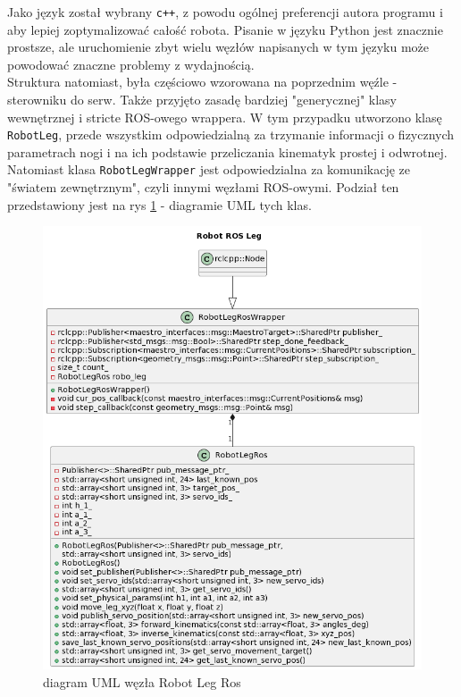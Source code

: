 Jako język został wybrany \texttt{c++}, z powodu ogólnej preferencji autora programu i aby lepiej zoptymalizować całość robota. Pisanie w języku Python jest znacznie prostsze, ale uruchomienie zbyt wielu węzłów napisanych w tym języku może powodować znaczne problemy z wydajnością.\\

Struktura natomiast, była częściowo wzorowana na poprzednim węźle - sterowniku do serw. Także przyjęto zasadę bardziej "generycznej" klasy wewnętrznej i stricte ROS-owego wrappera. W tym przypadku utworzono klasę \texttt{RobotLeg}, przede wszystkim odpowiedzialną za trzymanie informacji o fizycznych parametrach nogi i na ich podstawie przeliczania kinematyk prostej i odwrotnej. Natomiast klasa \texttt{RobotLegWrapper} jest odpowiedzialna za komunikację ze "światem zewnętrznym", czyli innymi węzłami ROS-owymi. Podział ten przedstawiony jest na rys \ref{UML_leg} - diagramie UML tych klas.\\

\begin{figure}[h!]
\includegraphics[width=\textwidth]{UML_diagrams/RobotRosLeg.png}
\centering
\caption{diagram UML węzła Robot Leg Ros}
\label{UML_leg}
\end{figure}


